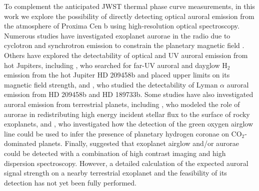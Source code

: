 \documentclass{emulateapj}
\newcommand{\XXX}[1]{#1}      %
\begin{document}
To complement the anticipated JWST thermal phase curve measurements, in this work we explore the possibility of directly detecting optical auroral emission from the atmosphere of Proxima Cen b using high-resolution optical spectroscopy. Numerous studies have investigated exoplanet aurorae in the radio due to cyclotron and synchrotron emission to constrain the planetary magnetic field \citep[e.g.][]{Bastian2000,Grie2007,Zarka2007,Hess2011,Driscoll2011,Griessmeier2015}. \XXX{Others have explored the detectability of optical and UV auroral emission from hot Jupiters, including \citet{France2010}, who searched for far-UV auroral and dayglow H$_2$ emission from the hot Jupiter HD 209458b and placed upper limits on its magnetic field strength, and \citet{Menager2013}, who studied the detectability of Lyman $\alpha$ auroral emission from HD 209458b and HD 189733b.} 
\XXX{Some studies have also investigated auroral emission from terrestrial planets, including \citet{Smith2004}, who modeled the role of aurorae in redistributing high energy incident stellar flux to the surface of rocky exoplanets, and \citet{Bernard2014}, who investigated how the detection of the green oxygen airglow line could be used to infer the presence of planetary hydrogen coronae on CO$_2$-dominated planets.} Finally, \citet{SparksFord2002} suggested that exoplanet airglow and/or aurorae could be detected with a combination of high contrast imaging and high dispersion spectroscopy. However, a detailed calculation of the expected auroral signal strength on a nearby \XXX{terrestrial} exoplanet and the feasibility of its detection has not yet been fully performed.
\end{document}

